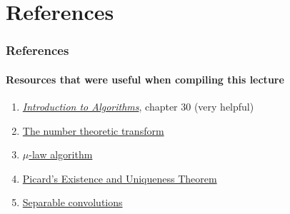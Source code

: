 \documentclass{beamer}                             %
\begin{document}
\section{References}
\begin{frame}
\frametitle{References}
\framesubtitle{Resources that were useful when compiling this lecture}
\begin{enumerate}
  \item \href{https://mitpress.mit.edu/books/introduction-algorithms-third-edition}
    {\textit{Introduction to Algorithms}}, chapter 30 (very helpful)
  \item \href{https://www.nayuki.io/page/number-theoretic-transform-integer-dft}
    {The number theoretic transform}
  \item \href{https://en.wikipedia.org/wiki/\%CE\%9C-law_algorithm}
    {\( \mu \)-law algorithm}
  \item \href{https://ptolemy.berkeley.edu/projects/embedded/eecsx44/lectures/Spring2013/Picard.pdf}
    {Picard's Existence and Uniqueness Theorem}
  \item \href{https://towardsdatascience.com/a-basic-introduction-to-separable-convolutions-b99ec3102728}
    {Separable convolutions}
\end{enumerate}
\end{frame}
\end{document}

